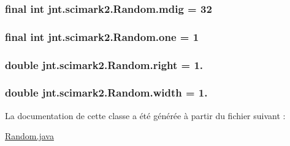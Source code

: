 \hypertarget{classjnt_1_1scimark2_1_1Random_ae9ade787ad441153ed665875e62030be}{
\subsubsection[{mdig}]{\setlength{\rightskip}{0pt plus 5cm}final int jnt.\-scimark2.\-Random.\-mdig = 32\hspace{0.3cm}{\ttfamily [private]}}}\label{classjnt_1_1scimark2_1_1Random_ae9ade787ad441153ed665875e62030be}
\hypertarget{classjnt_1_1scimark2_1_1Random_a1d4281d838c46418fd2d30a4f1d52cf0}{
\subsubsection[{one}]{\setlength{\rightskip}{0pt plus 5cm}final int jnt.\-scimark2.\-Random.\-one = 1\hspace{0.3cm}{\ttfamily [private]}}}\label{classjnt_1_1scimark2_1_1Random_a1d4281d838c46418fd2d30a4f1d52cf0}
\hypertarget{classjnt_1_1scimark2_1_1Random_a61abe62a2fb5de3294a2c231268bf893}{
\subsubsection[{right}]{\setlength{\rightskip}{0pt plus 5cm}double jnt.\-scimark2.\-Random.\-right = 1.\hspace{0.3cm}{\ttfamily [private]}}}\label{classjnt_1_1scimark2_1_1Random_a61abe62a2fb5de3294a2c231268bf893}
\hypertarget{classjnt_1_1scimark2_1_1Random_a9d0d92bf119171b4a77f7af5bd48693b}{
\subsubsection[{width}]{\setlength{\rightskip}{0pt plus 5cm}double jnt.\-scimark2.\-Random.\-width = 1.\hspace{0.3cm}{\ttfamily [private]}}}\label{classjnt_1_1scimark2_1_1Random_a9d0d92bf119171b4a77f7af5bd48693b}


La documentation de cette classe a été générée à partir du fichier suivant \-:\begin{DoxyCompactItemize}
\item 
\hyperlink{Random_8java}{Random.\-java}\end{DoxyCompactItemize}
